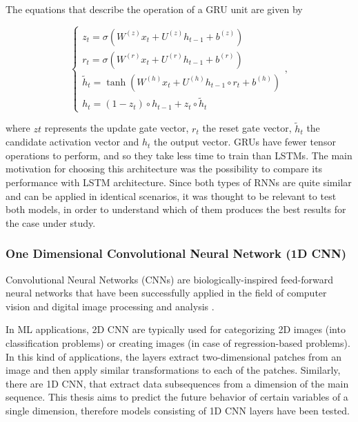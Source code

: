 The equations that describe the operation of a \ac{GRU} unit are given by 

\begin{equation}
    \begin{cases} 
        
        z_t = \sigma(W^{(z)} x_t + U^{(z)} h_{t-1} + b^{(z)})\\
        r_t = \sigma(W^{(r)} x_t + U^{(r)} h_{t-1} + b^{(r)})\\
        \tilde{h}_t = \tanh(W^{(h)} x_t + U^{(h)} h_{t-1} \circ r_t + b^{(h)})\\
        h_t = (1-z_t) \circ h_{t-1} + z_t \circ \tilde{h}_t

    \end{cases} ,
\end{equation}

where $zt$ represents the update gate vector, $r_t$ the reset gate vector, $\tilde{h}_t$ the candidate activation vector and $h_t$ the output vector. \ac{GRU}s have fewer tensor operations to perform, and so they take less time to train than \ac{LSTM}s. The main motivation for choosing this architecture was the possibility to compare its performance with \ac{LSTM} architecture. Since both types of \ac{RNN}s are quite similar and can be applied in identical scenarios, it was thought to be relevant to test both models, in order to understand which of them produces the best results for the case under study.

\subsubsection{One Dimensional Convolutional Neural Network (1D CNN)}\label{chap3:subsubsec:1dcnn}

Convolutional Neural Networks (\ac{CNN}s) are biologically-inspired feed-forward neural networks that have been successfully applied in the field of computer vision and digital image processing and analysis \cite{cnn0}.

In \ac{ML} applications, \ac{2D CNN} are typically used for categorizing 2D images (into classification problems) or creating images (in case of regression-based problems). In this kind of applications, the layers extract two-dimensional patches from an image and then apply similar transformations to each of the patches. Similarly, there are \ac{1D CNN}, that extract data subsequences from a dimension of the main sequence. This thesis aims to predict the future behavior of certain variables of a single dimension, therefore models consisting of \ac{1D CNN} layers have been tested.

